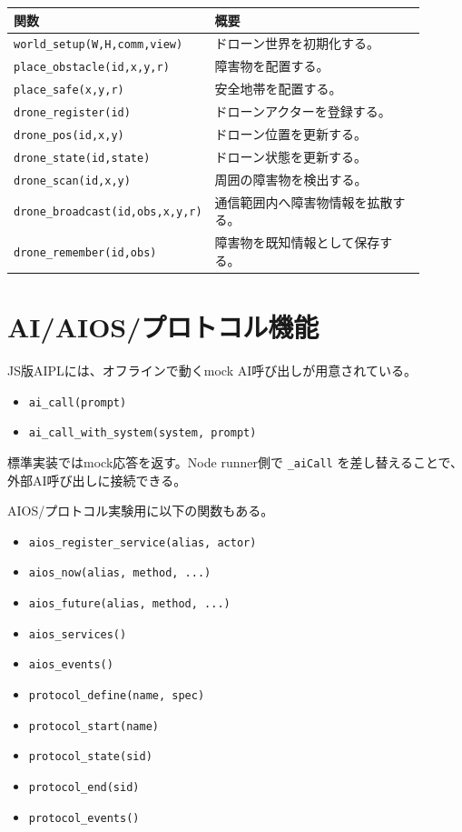 \documentclass[11pt,a4paper,uplatex,dvipdfmx]{jsarticle}
\begin{document}
\begin{longtable}{p{0.36\linewidth}p{0.54\linewidth}}
\toprule
関数 & 概要 \\
\midrule
\texttt{world\_setup(W,H,comm,view)} & ドローン世界を初期化する。 \\
\texttt{place\_obstacle(id,x,y,r)} & 障害物を配置する。 \\
\texttt{place\_safe(x,y,r)} & 安全地帯を配置する。 \\
\texttt{drone\_register(id)} & ドローンアクターを登録する。 \\
\texttt{drone\_pos(id,x,y)} & ドローン位置を更新する。 \\
\texttt{drone\_state(id,state)} & ドローン状態を更新する。 \\
\texttt{drone\_scan(id,x,y)} & 周囲の障害物を検出する。 \\
\texttt{drone\_broadcast(id,obs,x,y,r)} & 通信範囲内へ障害物情報を拡散する。 \\
\texttt{drone\_remember(id,obs)} & 障害物を既知情報として保存する。 \\
\bottomrule
\end{longtable}

\section{AI/AIOS/プロトコル機能}

JS版AIPLには、オフラインで動くmock AI呼び出しが用意されている。

\begin{itemize}
  \item \texttt{ai\_call(prompt)}
  \item \texttt{ai\_call\_with\_system(system, prompt)}
\end{itemize}

標準実装ではmock応答を返す。Node runner側で \texttt{\_aiCall} を差し替えることで、
外部AI呼び出しに接続できる。

AIOS/プロトコル実験用に以下の関数もある。

\begin{itemize}
  \item \texttt{aios\_register\_service(alias, actor)}
  \item \texttt{aios\_now(alias, method, ...)}
  \item \texttt{aios\_future(alias, method, ...)}
  \item \texttt{aios\_services()}
  \item \texttt{aios\_events()}
  \item \texttt{protocol\_define(name, spec)}
  \item \texttt{protocol\_start(name)}
  \item \texttt{protocol\_state(sid)}
  \item \texttt{protocol\_end(sid)}
  \item \texttt{protocol\_events()}
\end{itemize}
\end{document}
